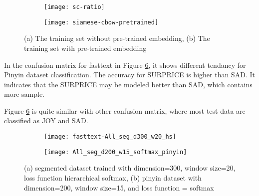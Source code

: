 \begin{figure}
\centering
\begin{subfigure}[b]{1\textwidth}
   \texttt{[image: sc-ratio]}
   \caption{}
   \label{confusion2} 
\end{subfigure}

\begin{subfigure}[b]{1\textwidth}
   \texttt{[image: siamese-cbow-pretrained]}
   \caption{}
   \label{confusion5}
\end{subfigure}
\caption[Confusion Matrix of Siamese-CBOW]{(a) The training set without pre-trained embedding,
(b) The training set with pre-trained embedding
}
\end{figure}


In the confusion matrix for fasttext in Figure \ref{confusion4}, it shows different tendancy for Pinyin dataset classification. 
The accuracy for SURPRICE is higher than SAD. It indicates that the SURPRICE may be modeled better than SAD, which contains more sample.

Figure \ref{confusion4} is quite similar with other confusion matrix, where most test data are classified as JOY and SAD.

\begin{figure}
\centering
\begin{subfigure}[b]{1\textwidth}
   \texttt{[image: fasttext-All\_seg\_d300\_w20\_hs]}
   \caption{}
   \label{confusion3} 
\end{subfigure}

\begin{subfigure}[b]{1\textwidth}
   \texttt{[image: All\_seg\_d200\_w15\_softmax\_pinyin]}
   \caption{}
   \label{confusion4}
\end{subfigure}
\caption[Confusion Matrix of FastText]{(a) segmented dataset trained with dimension=300, window size=20, loss function hierarchical softmax,
(b) pinyin dataset with dimension=200, window size=15, and loss function = softmax
}
\end{figure}
